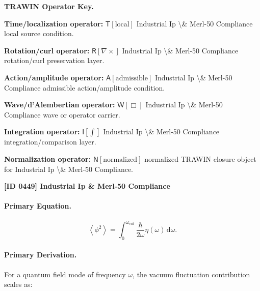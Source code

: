 \par\vspace{0.45\baselineskip}
\noindent\begin{minipage}[t]{\linewidth}
\begingroup
\small
\raggedright
\textbf{TRAWIN Operator Key.}\par
\noindent\textbf{Time/localization operator:} $\mathsf{T}\!\left[\mathrm{local}\right]$ Industrial Ip \textbackslash{}\& Merl-50 Compliance local source condition.\par
\noindent\textbf{Rotation/curl operator:} $\mathsf{R}\!\left[\nabla\times\right]$ Industrial Ip \textbackslash{}\& Merl-50 Compliance rotation/curl preservation layer.\par
\noindent\textbf{Action/amplitude operator:} $\mathsf{A}\!\left[\mathrm{admissible}\right]$ Industrial Ip \textbackslash{}\& Merl-50 Compliance admissible action/amplitude condition.\par
\noindent\textbf{Wave/d'Alembertian operator:} $\mathsf{W}\!\left[\Box\right]$ Industrial Ip \textbackslash{}\& Merl-50 Compliance wave or operator carrier.\par
\noindent\textbf{Integration operator:} $\mathsf{I}\!\left[\int\right]$ Industrial Ip \textbackslash{}\& Merl-50 Compliance integration/comparison layer.\par
\noindent\textbf{Normalization operator:} $\mathsf{N}\!\left[\mathrm{normalized}\right]$ normalized TRAWIN closure object for Industrial Ip \textbackslash{}\& Merl-50 Compliance.\par
\endgroup
\end{minipage}

\clearpage
\noindent\textbf{[ID 0449] Industrial Ip \& Merl-50 Compliance}\par
\vspace{0.35em}
\paragraph{Primary Equation.}
\begin{equation}
\left\langle\phi^2\right\rangle
=
\int_{0}^{\omega_{\mathrm{cut}}}
\frac{\hbar}{2\omega}
\eta(\omega)
\,\mathrm{d}\omega .
\end{equation}

\paragraph{Primary Derivation.}
For a quantum field mode of frequency $\omega$, the vacuum fluctuation contribution scales as:

